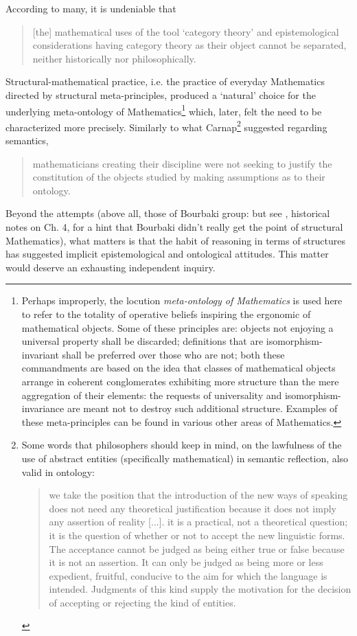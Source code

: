 According to many, it is undeniable that
\begin{quote}
	[the] mathematical uses of the tool `category theory' and epistemological considerations having category theory as their object cannot be separated, neither historically nor philosophically. \cite{kromer2007tool}
\end{quote}
Structural-mathematical practice, i.e. the practice of everyday Mathematics directed by structural meta-principles, produced a `natural' choice for the underlying meta-ontology of Mathematics\footnote{Perhaps improperly, the locution \emph{meta-ontology of Mathematics} is used here to refer to the totality of operative beliefs inspiring the ergonomic of mathematical objects. Some of these principles are: objects not enjoying a universal property shall be discarded; definitions that are isomorphism-invariant shall be preferred over those who are not; both these commandments are based on the idea that classes of mathematical objects arrange in coherent conglomerates exhibiting more structure than the mere aggregation of their elements: the requests of universality and isomorphism-invariance are meant not to destroy such additional structure. Examples of these meta-principles can be found in various other areas of Mathematics.} which, later, felt the need to be characterized more precisely. Similarly to what Carnap\footnote{Some words that philosophers should keep in mind, on the lawfulness of the use of abstract entities (specifically mathematical) in semantic reflection, also valid in ontology:
	\begin{quote}
		we take the position that the introduction of the new ways of speaking does not need any theoretical justification because it does not imply any assertion of reality [...].  it is a practical, not a theoretical question; it is the question of whether or not to accept the new linguistic forms. The acceptance cannot be judged as being either true or false because it is not an assertion. It can only be judged as being more or less expedient, fruitful, conducive to the aim for which the language is intended. Judgments of this kind supply the motivation for the decision of accepting or rejecting the kind of entities. \hfill \cite{carnap1956meaning}
	\end{quote}} suggested regarding semantics,
\begin{quote}
	mathematicians creating their discipline were not seeking to justify the constitution of the objects studied by making assumptions as to their ontology.\hfill  \cite{kromer2007tool}
\end{quote}
Beyond the attempts (above all, those of Bourbaki group: but see \cite{McL}, historical notes on Ch. 4, for a hint that Bourbaki didn't really get the point of structural Mathematics), what matters is that the habit of reasoning in terms of structures has suggested implicit epistemological and ontological attitudes. This matter would deserve an exhausting independent inquiry.

